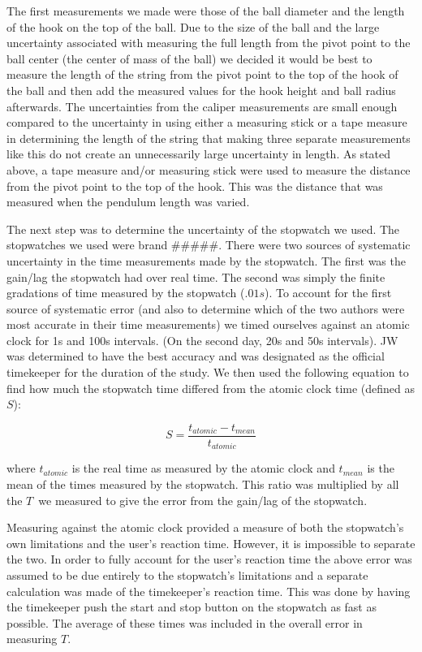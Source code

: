 \documentclass[iop]{emulateapj}
\def\T{$T$}
\begin{document}
The first measurements we made were those of the ball diameter and the length 
of the hook on the top of the ball.  Due to the size of 
the ball and the large uncertainty associated with measuring the full length 
from the pivot point to the ball center (the center of mass of the
ball) we decided it would be best to measure the length of the string from the
pivot point to the top of the hook of the ball and then add the measured values 
for the hook height and ball radius afterwards.  The uncertainties from the 
caliper measurements are small enough compared to the uncertainty in using 
either a measuring stick or a tape measure in determining the length of the
string that making three separate measurements like this do not create an 
unnecessarily large uncertainty in length.  As stated above, a tape measure 
and/or measuring stick were used to measure the distance from the pivot point
to the top of the hook.  This was the distance that was measured when the
pendulum length was varied.

The next step was to determine the uncertainty of the stopwatch we used.  The
stopwatches we used were brand \#\#\#\#\#.  There were two sources of systematic 
uncertainty in the time measurements made by the stopwatch.  The first was the 
gain/lag the stopwatch had over real time.  The second was simply the finite 
gradations of time measured by the stopwatch ($.01 s$).  To account for the 
first source of systematic error (and also to determine which of the two 
authors were most accurate in their time measurements) we timed 
ourselves against an atomic clock for 1s and 100s intervals.  (On the second
day, 20s and 50s intervals). JW 
was determined to have the best accuracy and was 
designated as the official timekeeper for the duration of the study.  
We then used the following equation to find how much the stopwatch time
differed from the atomic clock time (defined as $S$):

\begin{equation}
\label{eq:S}
S=\frac{t_{atomic}-t_{mean}}{t_{atomic}} 
\end{equation}

where $t_{atomic}$ is the real time as measured by the 
atomic clock 
and $t_{mean}$ is the mean of the times measured by the 
stopwatch.  This ratio was multiplied by all the \T\ we measured to give
the error from the gain/lag of the stopwatch.

Measuring against the atomic clock provided a measure of both the stopwatch's 
own limitations and the user's reaction time.  However, it is impossible to 
separate the two.  In order to fully account for the user's reaction time the 
above error was assumed to be due entirely to the stopwatch's limitations and 
a separate calculation was made of the timekeeper's reaction time.  This was 
done by having the timekeeper push the start and stop button on the 
stopwatch as fast as possible.  The average of these times was included in 
the overall error in measuring \T.
\end{document}

